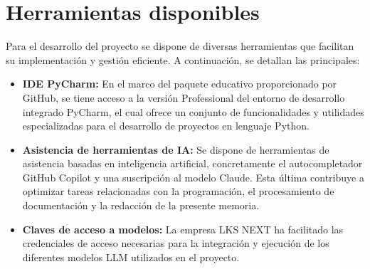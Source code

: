 \section{Herramientas disponibles}
Para el desarrollo del proyecto se dispone de diversas herramientas que facilitan su implementación y gestión eficiente. A continuación, se detallan las principales:
\begin{itemize}
\item\textbf{IDE PyCharm: }En el marco del paquete educativo proporcionado por GitHub, se tiene acceso a la versión Professional del entorno de desarrollo integrado PyCharm, el cual ofrece un conjunto de funcionalidades y utilidades especializadas para el desarrollo de proyectos en lenguaje Python.
\item\textbf{Asistencia de herramientas de IA: }Se dispone de herramientas de asistencia basadas en inteligencia artificial, concretamente el autocompletador GitHub Copilot y una suscripción al modelo Claude. Esta última contribuye a optimizar tareas relacionadas con la programación, el procesamiento de documentación y la redacción de la presente memoria.
\item\textbf{Claves de acceso a modelos: }La empresa LKS NEXT ha facilitado las credenciales de acceso necesarias para la integración y ejecución de los diferentes modelos LLM utilizados en el proyecto.
\end{itemize}












